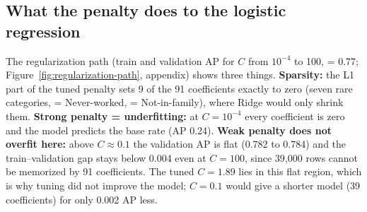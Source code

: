 \subsection{What the penalty does to the logistic regression}
\label{sec:regularization}

The regularization path (train and validation AP for $C$ from $10^{-4}$ to
100,  = 0.77; Figure~\ref{fig:regularization-path}, appendix)
shows three things. \textbf{Sparsity:} the L1 part of the tuned penalty sets 9
of the 91 coefficients exactly to zero (seven rare 
categories,  = Never-worked,  =
Not-in-family), where Ridge would only shrink them. \textbf{Strong penalty =
underfitting:} at $C = 10^{-4}$ every coefficient is zero and the model
predicts the base rate (AP 0.24). \textbf{Weak penalty does not overfit
here:} above $C \approx 0.1$ the validation AP is flat (0.782 to 0.784) and
the train--validation gap stays below 0.004 even at $C = 100$, since 39{,}000
rows cannot be memorized by 91 coefficients. The tuned $C = 1.89$ lies in this
flat region, which is why tuning did not improve the model; $C = 0.1$ would
give a shorter model (39 coefficients) for only 0.002 AP less.
